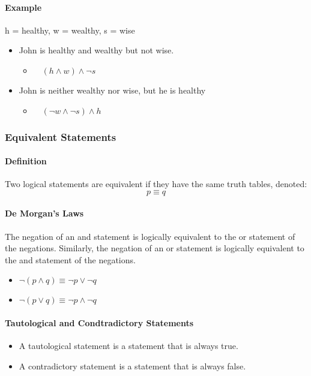 \paragraph*{Example}
h = healthy, w = wealthy, s = wise\\
\begin{itemize}
    \item John is healthy and wealthy but not wise. 
    \begin{itemize}
        \item $\quad (h \land w) \land \neg s$
    \end{itemize}
    \item John is neither wealthy nor wise, but he is healthy
    \begin{itemize}
        \item $\quad (\neg w \land \neg s) \land h$
    \end{itemize} 
\end{itemize}

\subsubsection{Equivalent Statements}
\paragraph*{Definition}
Two logical statements are equivalent if they have the same truth tables, denoted:
\begin{equation*}
    p \equiv q
\end{equation*}

\paragraph*{De Morgan's Laws}
The negation of an and statement is logically equivalent to the or statement of the negations. Similarly,
the negation of an or statement is logically equivalent to the and statement of the negations.
\begin{itemize}
    \item $\neg (p \land q) \equiv \neg p \lor \neg q$
    \item $\neg (p \lor q) \equiv \neg p \land \neg q$
\end{itemize}

\paragraph*{Tautological and Condtradictory Statements}
\begin{itemize}
    \item A tautological statement is a statement that is always true.
    \item A contradictory statement is a statement that is always false.
\end{itemize}